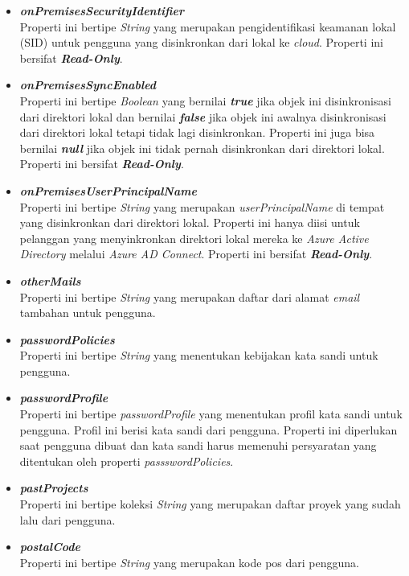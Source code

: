 \begin{itemize}
	\item \textbf{\textit{onPremisesSecurityIdentifier}}\\
	Properti ini bertipe \textit{String} yang merupakan pengidentifikasi keamanan lokal (SID) untuk pengguna yang disinkronkan dari lokal ke \textit{cloud}. Properti ini bersifat \textbf{\textit{Read-Only}}.
	\item \textbf{\textit{onPremisesSyncEnabled}}\\
	Properti ini bertipe \textit{Boolean} yang bernilai \textbf{\textit{true}} jika objek ini disinkronisasi dari direktori lokal dan bernilai \textbf{\textit{false}} jika objek ini awalnya disinkronisasi dari direktori lokal tetapi tidak lagi disinkronkan. Properti ini juga bisa bernilai \textbf{\textit{null}} jika objek ini tidak pernah disinkronkan dari direktori lokal. Properti ini bersifat \textbf{\textit{Read-Only}}.
	\item \textbf{\textit{onPremisesUserPrincipalName}}\\
	Properti ini bertipe \textit{String} yang merupakan \textit{userPrincipalName} di tempat yang disinkronkan dari direktori lokal. Properti ini hanya diisi untuk pelanggan yang menyinkronkan direktori lokal mereka ke \textit{Azure Active Directory} melalui \textit{Azure AD Connect}. Properti ini bersifat \textbf{\textit{Read-Only}}.
	\item \textbf{\textit{otherMails}}\\
	Properti ini bertipe \textit{String} yang merupakan daftar dari alamat \textit{email} tambahan untuk pengguna.
	\item \textbf{\textit{passwordPolicies}}\\
	Properti ini bertipe \textit{String} yang menentukan kebijakan kata sandi untuk pengguna. 
	\item \textbf{\textit{passwordProfile}}\\
	Properti ini bertipe \textit{passwordProfile} yang menentukan profil kata sandi untuk pengguna. Profil ini berisi kata sandi dari pengguna. Properti ini diperlukan saat pengguna dibuat dan kata sandi harus memenuhi persyaratan yang ditentukan oleh properti \textit{passswordPolicies}.
	\item \textbf{\textit{pastProjects}}\\
	Properti ini bertipe koleksi \textit{String} yang merupakan daftar proyek yang sudah lalu dari pengguna.
	\item \textbf{\textit{postalCode}}\\
	Properti ini bertipe \textit{String} yang merupakan kode pos dari pengguna.

\end{itemize}
